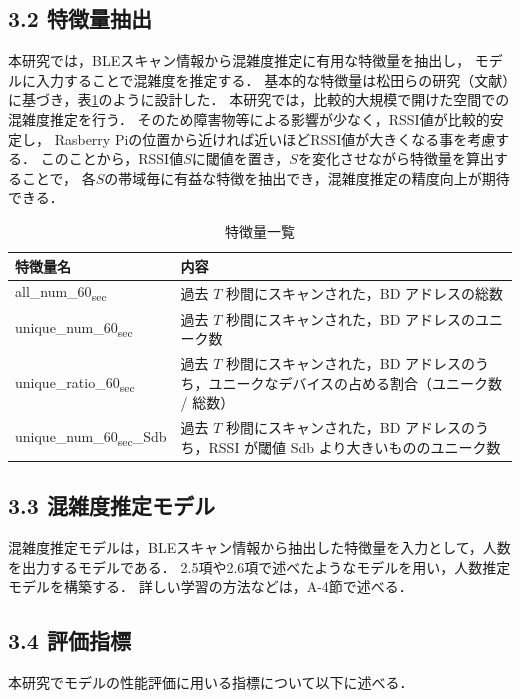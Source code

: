 \subsection*{3.2 特徴量抽出}
本研究では，BLEスキャン情報から混雑度推定に有用な特徴量を抽出し，
モデルに入力することで混雑度を推定する．
基本的な特徴量は松田らの研究（文献）に基づき，表\ref{tbl:feastures}のように設計した．
本研究では，比較的大規模で開けた空間での混雑度推定を行う．
そのため障害物等による影響が少なく，RSSI値が比較的安定し，
Rasberry Piの位置から近ければ近いほどRSSI値が大きくなる事を考慮する．
このことから，RSSI値$S$に閾値を置き，$S$を変化させながら特徴量を算出することで，
各$S$の帯域毎に有益な特徴を抽出でき，混雑度推定の精度向上が期待できる．

\begin{table}[tb]
	\centering
	\caption{特徴量一覧}
	\label{tbl:feastures}
	\small
	\doublerulesep=0.3pt
    \begin{tabular}{l|p{5cm}} \hline\hline\hline
		特徴量名 & 内容 \\ \hline
		all\_num\_60\textsubscript{sec} & 過去 $T$ 秒間にスキャンされた，BD アドレスの総数\\ \hline
    unique\_num\_60\textsubscript{sec} & 過去 $T$ 秒間にスキャンされた，BD アドレスのユニーク数 \\ \hline
    unique\_ratio\_60\textsubscript{sec} & 過去 $T$ 秒間にスキャンされた，BD アドレスのうち，ユニークなデバイスの占める割合（ユニーク数 / 総数） \\ \hline
    unique\_num\_60\textsubscript{sec}\_Sdb & 過去 $T$ 秒間にスキャンされた，BD アドレスのうち，RSSI が閾値 Sdb より大きいもののユニーク数 \\ \hline\hline\hline
	\end{tabular}
\end{table}

\subsection*{3.3 混雑度推定モデル}
混雑度推定モデルは，BLEスキャン情報から抽出した特徴量を入力として，人数を出力するモデルである．
2.5項や2.6項で述べたようなモデルを用い，人数推定モデルを構築する．
詳しい学習の方法などは，A-4節で述べる．

\subsection*{3.4 評価指標}
本研究でモデルの性能評価に用いる指標について以下に述べる．

